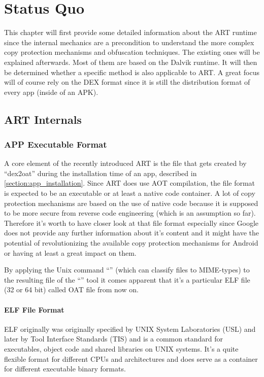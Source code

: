 \chapter{Status Quo}
\label{chapter:copy_protection_status_quo}

This chapter will first provide some detailed information about the ART runtime since the internal mechanics are a precondition to understand the more complex copy protection mechanisms and obfuscation techniques. The existing ones will be explained afterwards. Most of them are based on the Dalvik runtime. It will then be determined whether a specific method is also
applicable to ART. A great focus will of course rely on the DEX format since
it is still the distribution format of every app (inside of an APK).

\section{ART Internals}
\label{section:art_internals}

\subsection{APP Executable Format}\label{section:app_executable_format}

A core element of the recently introduced ART is the file that
gets created by ``dex2oat'' during the installation time of an app,
described in \autoref{section:app_installation}.
Since ART does use AOT compilation, the file format is expected
to be an executable or at least a native code container.
A lot of copy protection mechanisms are based on the use of native
code because it is supposed to be more secure from reverse code
engineering (which is an assumption so far).
Therefore it's worth to have closer look at that file format
especially since Google does not provide any further information
about it's content and it might have the potential of
revolutionizing the available copy protection mechanisms for
Android or having at least a great impact on them.

By applying the Unix command ``'' (which can classify
files to MIME-types) to the resulting file of the ``''
tool it comes apparent that it's a particular ELF file (32 or 64 bit)
called OAT file from now on.

\subsubsection{ELF File Format}\label{section:elf_file_format}
ELF originally was originally specified by UNIX System Laboratories
(USL) and later by Tool Interface Standards (TIS) and is a common
standard for executables, object code and shared libraries on UNIX
systems. It's a quite flexible format for different CPUs and
architectures and does serve as a container for different
executable binary formats.

